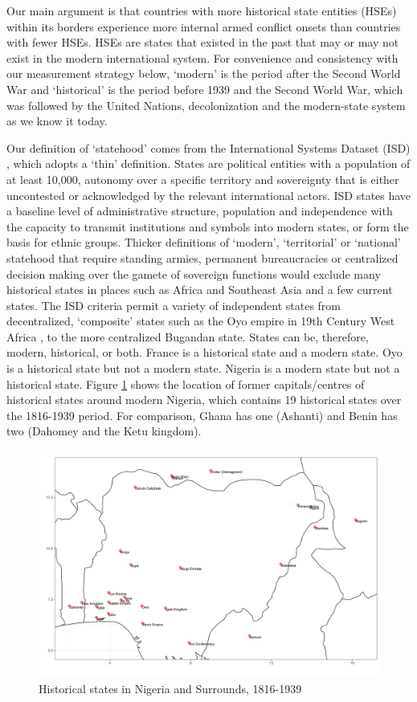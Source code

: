 Our main argument is that countries with more historical state entities (HSEs)
within its borders experience more internal armed conflict onsets than countries
with fewer HSEs. HSEs are states that existed in the past that may or may not
exist in the modern international system. For convenience and consistency with
our measurement strategy below, `modern' is the period after the Second World
War and `historical' is the period before 1939 and the Second World War, which
was followed by the United Nations, decolonization and the modern-state system
as we know it today. 

Our definition of `statehood' comes from the International Systems Dataset (ISD)
\citep{Butcher2020}, which adopts a `thin' definition. States are political
entities with a population of at least 10,000, autonomy over a specific
territory and sovereignty that is either uncontested or acknowledged by the
relevant international actors. ISD states have a baseline level of
administrative structure, population and independence with the capacity to
transmit institutions and symbols into modern states, or form the basis for
ethnic groups. Thicker definitions of `modern', `territorial' or `national'
statehood that require standing armies, permanent bureaucracies or centralized
decision making over the gamete of sovereign functions would exclude many
historical states in places such as Africa and Southeast Asia \citep{Spruyt1998}
and a few current states. The ISD criteria permit a variety of independent
states from decentralized, `composite' states \citep{Nexon2009} such as the Oyo
empire in 19th Century West Africa \citep{Law1977}, to the more centralized
Bugandan state. States can be, therefore, modern, historical, or both. France is
a historical state and a modern state. Oyo is a historical state but not a
modern state. Nigeria is a modern state but not a historical state. Figure
\ref{fig: westafrica} shows the location of former capitals/centres of
historical states around modern Nigeria, which contains 19 historical states
over the 1816-1939 period. For comparison, Ghana has one (Ashanti) and  Benin
has two (Dahomey and the Ketu kingdom). 

\begin{figure}[!htb] 
        \includegraphics[width=\textwidth]{img/isd_west_africa.png}
	\caption{Historical states in Nigeria and Surrounds, 1816-1939} 
	\label{fig: westafrica} 
\end{figure}

